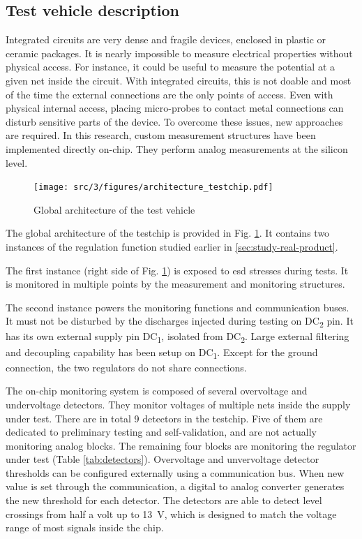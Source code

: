 \subsection{Test vehicle description}
\label{sec:test-vehicle-desc}

Integrated circuits are very dense and fragile devices, enclosed in plastic or ceramic packages.
It is nearly impossible to measure electrical properties without physical access.
For instance, it could be useful to measure the potential at a given net inside the circuit.
With integrated circuits, this is not doable and most of the time the external connections are the only points of access.
Even with physical internal access, placing micro-probes to contact metal connections can disturb sensitive parts of the device.
To overcome these issues, new approaches are required.
In this research, custom measurement structures have been implemented directly on-chip.
They perform analog measurements at the silicon level.

\begin{figure}[h]
  \centering
  \texttt{[image: src/3/figures/architecture\_testchip.pdf]}
  \caption{Global architecture of the test vehicle}
  \label{architecture_testchip}
\end{figure}

The global architecture of the testchip is provided in Fig. \ref{architecture_testchip}.
It contains two instances of the regulation function studied earlier in \ref{sec:study-real-product}.

The first instance (right side of Fig. \ref{architecture_testchip}) is exposed to \gls{esd} stresses during tests.
It is monitored in multiple points by the measurement and monitoring structures.

The second instance powers the monitoring functions and communication buses.
It must not be disturbed by the discharges injected during testing on DC\textsubscript{2} pin.
It has its own external supply pin DC\textsubscript{1}, isolated from DC\textsubscript{2}.
Large external filtering and decoupling capability has been setup on DC\textsubscript{1}.
Except for the ground connection, the two regulators do not share connections.

The on-chip monitoring system is composed of several overvoltage and undervoltage detectors.
They monitor voltages of multiple nets inside the supply under test.
There are in total 9 detectors in the testchip.
Five of them are dedicated to preliminary testing and self-validation, and are not actually monitoring analog blocks.
The remaining four blocks are monitoring the regulator under test (Table \ref{tab:detectors}).
Overvoltage and unvervoltage detector thresholds can be configured externally using a communication bus.
When new value is set through the communication, a digital to analog converter generates the new threshold for each detector.
The detectors are able to detect level crossings from half a volt up to \SI{13}{\volt}, which is designed to match the voltage range of most signals inside the chip.

